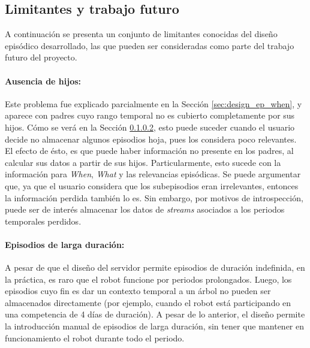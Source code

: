 \subsection{Limitantes y trabajo futuro}


A continuación se presenta un conjunto de limitantes conocidas del diseño episódico desarrollado, las que pueden ser consideradas como parte del trabajo futuro del proyecto.

\paragraph{Ausencia de hijos:} Este problema fue explicado parcialmente en la Sección \ref{sec:design_ep_when}, y aparece con padres cuyo rango temporal no es cubierto completamente por sus hijos. Cómo se verá en la Sección \ref{}, esto puede suceder cuando el usuario decide no almacenar algunos episodios hoja, pues los considera poco relevantes. El efecto de ésto, es que puede haber información no presente en los padres, al calcular sus datos a partir de sus hijos. Particularmente, esto sucede con la información para \textit{When}, \textit{What} y las relevancias episódicas. Se puede argumentar que, ya que el usuario considera que los subepisodios eran irrelevantes, entonces la información perdida también lo es. Sin embargo, por motivos de introspección, puede ser de interés almacenar los datos de \textit{streams} asociados a los periodos temporales perdidos.

\paragraph{Episodios de larga duración:}
A pesar de que el diseño del servidor permite episodios de duración indefinida, en la práctica, es raro que el robot funcione por periodos prolongados. Luego, los episodios cuyo fin es dar un contexto temporal a un árbol no pueden ser almacenados directamente (por ejemplo, cuando el robot está participando en una competencia de 4 días de duración). A pesar de lo anterior, el diseño permite la introducción manual de episodios de larga duración, sin tener que mantener en funcionamiento el robot durante todo el periodo.

